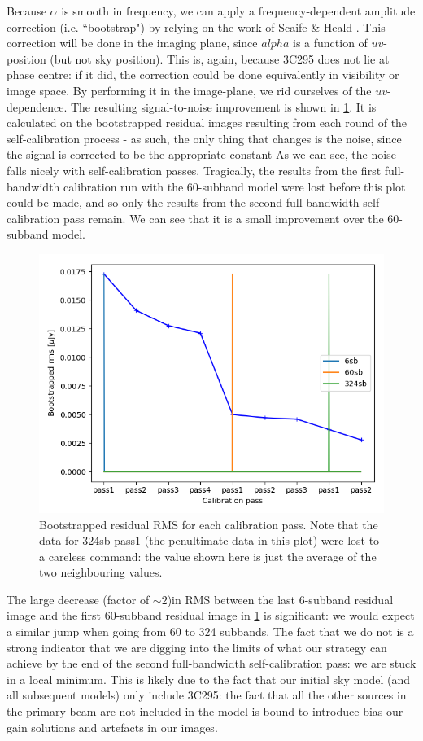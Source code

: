 \pg
Because $\alpha$ is smooth in frequency, we can apply a frequency-dependent amplitude correction (i.e. ``bootstrap") by relying on the work of Scaife \& Heald \citep[see][]{arse}. This correction will be done in the imaging plane, since $alpha$ is a function of $uv$-position (but not sky position). This is, again, because 3C295 does not lie at phase centre: if it did, the correction could be done equivalently in visibility or image space. By performing it in the image-plane, we rid ourselves of the $uv$-dependence. The resulting signal-to-noise improvement is shown in \cref{fig.SCrms}. It is calculated on the bootstrapped residual images resulting from each round of the self-calibration process - as such, the only thing that changes is the noise, since the signal is corrected to be the appropriate constant As we can see, the noise falls nicely with self-calibration passes. Tragically, the results from the first full-bandwidth calibration run with the 60-subband model were lost before this plot could be made, and so only the results from the second full-bandwidth self-calibration pass remain. We can see that it is a small improvement over the 60-subband model. 
\begin{figure}[h!]
\includegraphics[width=0.8\linewidth]{images/SCrms.png}
\caption{\label{fig.SCrms} Bootstrapped residual RMS for each calibration pass. Note that the data for 324sb-pass1 (the penultimate data in this plot) were lost to a careless command: the value shown here is just the average of the two neighbouring values.}
\end{figure}

\pg
The large decrease (factor of $\sim2$)in RMS between the last 6-subband residual image and the first 60-subband residual image in \cref{fig.SCrms} is significant: we would expect a similar jump when going from 60 to 324 subbands. The fact that we do not is a strong indicator that we are digging into the limits of what our strategy can achieve by the end of the second full-bandwidth self-calibration pass: we are stuck in a local minimum. This is likely due to the fact that our initial sky model (and all subsequent models) only include 3C295: the fact that all the other sources in the primary beam are not included in the model is bound to introduce bias our gain solutions and artefacts in our images. 


